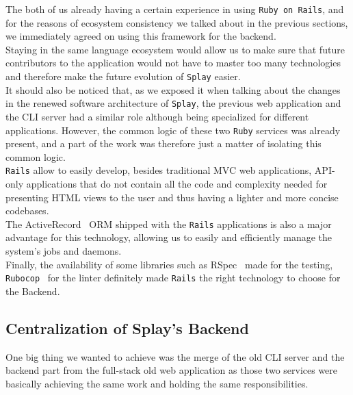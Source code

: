 \documentclass{eplmastersthesis}
\begin{document}
        The both of us already having a certain experience in using \texttt{Ruby on
        Rails}, and for the reasons of ecosystem consistency we talked about
        in the previous sections, we immediately agreed on using this
        framework for the backend.\\
        Staying in the same language ecosystem would allow us to make sure
        that future contributors to the application would not have to master
        too many technologies and therefore make the future evolution
        of \texttt{Splay} easier.\\

        It should also be noticed that, as we exposed it when talking about the
        changes in the renewed software architecture of \texttt{Splay}, the previous
        web application and the CLI server had a similar role although being
        specialized for different applications. However, the common logic
        of these two \texttt{Ruby} services was already present, and a part of the
        work was therefore just a matter of isolating this common logic.\\

        \texttt{Rails} allow to easily develop, besides traditional MVC web
        applications, API-only applications that do not contain all the code
        and complexity needed for presenting HTML views to the user and thus
        having a lighter and more concise codebases.\\

        The ActiveRecord~\cite{activerecord} ORM shipped with the \texttt{Rails}
        applications is also a major advantage for this technology, allowing us
        to easily and efficiently manage the system's jobs and daemons.\\
        Finally, the availability of some libraries such as RSpec~\cite{rspec}
        made for the testing, \texttt{Rubocop}~\cite{Rubocop} for the linter definitely
        made \texttt{Rails} the right technology to choose for the Backend.

      \subsection{Centralization of Splay's Backend}

        One big thing we wanted to achieve was the merge of the old CLI
        server and the backend part from the full-stack old web application
        as those two services were basically achieving the same work and
        holding the same responsibilities.\\
\end{document}

